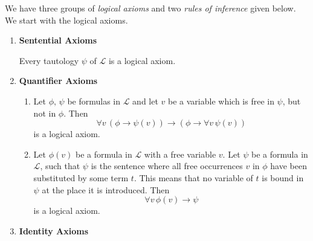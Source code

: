 \documentclass[../../main.tex]{subfiles}
\begin{document}
\begin{definition}\cite[1.3.5-1.3.9.]{Cha90}
    We have three groups of \textit{logical axioms} and two \textit{rules of inference} given below.
    We start with the logical axioms.
    \begin{enumerate}
        \item \textbf{Sentential Axioms}
        
        Every tautology $\psi$ of $\mathcal{L}$ is a logical axiom. %
        \item\label{quantifier-axioms} \textbf{Quantifier Axioms}
        \begin{enumerate}
            \item Let $\phi,\, \psi$ be formulas in $\mathcal{L}$ and let $v$ be a variable which is free in $\psi$, but not in $\phi$.
            Then
            $$\forall v \, (\phi \rightarrow \psi(v)) \rightarrow (\phi \rightarrow \forall v\, \psi(v))$$
            is a logical axiom.
            \item Let $\phi(v)$ be a formula in $\mathcal{L}$ with a free variable $v$.
            Let $\psi$ be a formula in $\mathcal{L}$, 
            such that $\psi$ is the sentence where all free occurrences $v$ in $\phi$ have been substituted by some term $t$.
            This means that no variable of $t$ is bound in $\psi$ at the place it is introduced.
            Then 
            $$\forall v \, \phi(v) \rightarrow \psi$$
            is a logical axiom.
        \end{enumerate}
        \item\label{identity-axioms} \textbf{Identity Axioms}
        

\end{enumerate}
\end{definition}
\end{document}

